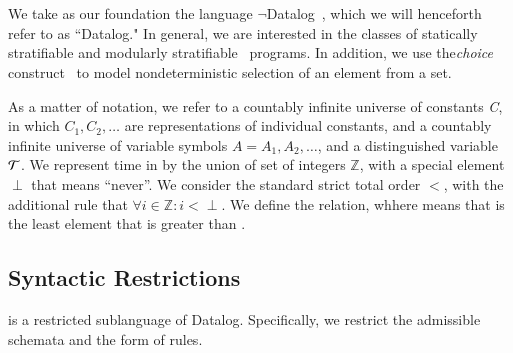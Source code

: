 \section{\large \bf \slang}
We take as our foundation the language $\lnot$Datalog~\cite{ullmanbook}, which
we will henceforth refer to as ``Datalog." In general, we are interested in the
classes of statically stratifiable 
and modularly stratifiable~\cite{modular} programs.  In addition, we use
the\emph{choice} construct~\cite{greedychoice, eventchoice} to model
nondeterministic selection of an element from a set.  

As a matter of notation, we refer to a countably infinite universe of constants
\emph{C}, in which $C_{1}, C_{2}, \ldots$ are representations of individual
constants, and a countably infinite universe of variable symbols $A = A_1, A_2,
\ldots$, and a distinguished variable $\Tau$. 
We represent time in \slang by the union of set of integers $\mathbb{Z}$, with
a special element $\perp$ that means ``never''.  We consider the standard
strict total order $<$, with the additional rule that $\forall i \in
\mathbb{Z}: i < \perp$.  We define the  relation, whhere
 means that  is the least element that is
greater than . 


\subsection{Syntactic Restrictions}
\label{sec:syntaxrestrictions}

\slang is a restricted sublanguage of Datalog.  Specifically, we
restrict the admissible schemata and the form of rules.

